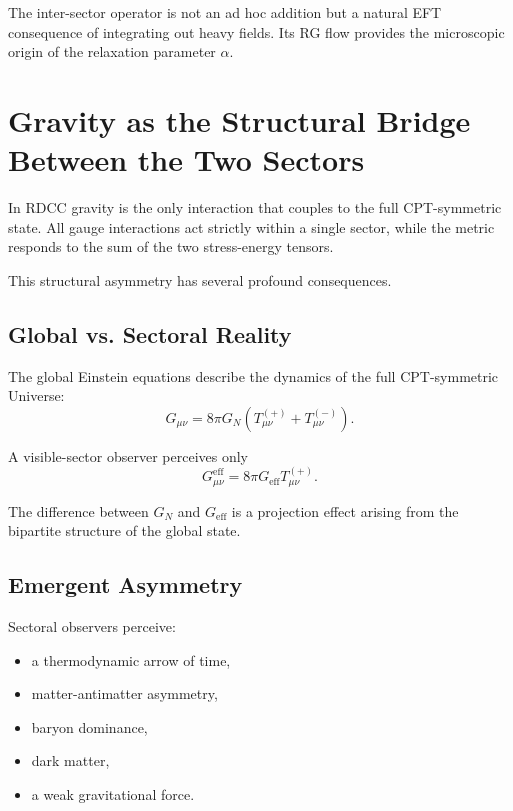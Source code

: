 \documentclass[11pt,a4paper]{article}
\begin{document}
The inter-sector operator is not an ad hoc addition but a natural EFT consequence of integrating out heavy fields. Its RG flow provides the microscopic origin of the relaxation parameter $\alpha$.

\section{Gravity as the Structural Bridge Between the Two Sectors}

In RDCC gravity is the only interaction that couples to the full CPT-symmetric state. All gauge interactions act strictly within a single sector, while the metric responds to the sum of the two stress-energy tensors.

This structural asymmetry has several profound consequences.

\subsection{Global vs. Sectoral Reality}

The global Einstein equations describe the dynamics of the full CPT-symmetric Universe:
\begin{equation}
G_{\mu\nu} = 8\pi G_N (T_{\mu\nu}^{(+)} + T_{\mu\nu}^{(-)}).
\end{equation}

A visible-sector observer perceives only
\begin{equation}
G_{\mu\nu}^{\mathrm{eff}} = 8\pi G_{\mathrm{eff}} T_{\mu\nu}^{(+)}.
\end{equation}

The difference between $G_N$ and $G_{\mathrm{eff}}$ is a projection effect arising from the bipartite structure of the global state.

\subsection{Emergent Asymmetry}

Sectoral observers perceive:

\begin{itemize}
\item a thermodynamic arrow of time,
\item matter-antimatter asymmetry,
\item baryon dominance,
\item dark matter,
\item a weak gravitational force.
\end{itemize}
\end{document}
